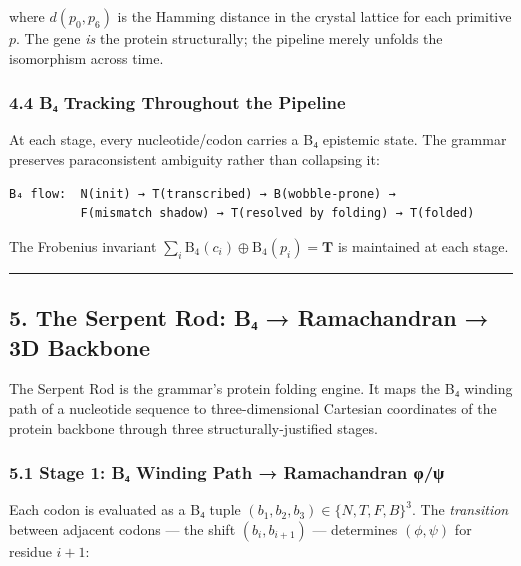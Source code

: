 \documentclass[12pt,a4paper]{article}
\begin{document}
where \(d(p_0, p_6)\) is the Hamming distance in the crystal lattice for
each primitive \(p\). The gene \emph{is} the protein structurally; the
pipeline merely unfolds the isomorphism across time.

\hypertarget{bux2084-tracking-throughout-the-pipeline}{%
\subsubsection{4.4 B₄ Tracking Throughout the
Pipeline}\label{bux2084-tracking-throughout-the-pipeline}}

At each stage, every nucleotide/codon carries a B₄ epistemic state. The
grammar preserves paraconsistent ambiguity rather than collapsing it:

\begin{verbatim}
B₄ flow:  N(init) → T(transcribed) → B(wobble-prone) → 
          F(mismatch shadow) → T(resolved by folding) → T(folded)
\end{verbatim}

The Frobenius invariant
\(\sum_i \text{B}_4(c_i) \oplus \text{B}_4(p_i) = \mathbf{T}\) is
maintained at each stage.

\begin{center}\rule{0.5\linewidth}{0.5pt}\end{center}

\hypertarget{the-serpent-rod-bux2084-ramachandran-3d-backbone}{%
\subsection{5. The Serpent Rod: B₄ → Ramachandran → 3D
Backbone}\label{the-serpent-rod-bux2084-ramachandran-3d-backbone}}

The Serpent Rod is the grammar's protein folding engine. It maps the B₄
winding path of a nucleotide sequence to three-dimensional Cartesian
coordinates of the protein backbone through three structurally-justified
stages.

\hypertarget{stage-1-bux2084-winding-path-ramachandran-ux3c6ux3c8}{%
\subsubsection{5.1 Stage 1: B₄ Winding Path → Ramachandran
φ/ψ}\label{stage-1-bux2084-winding-path-ramachandran-ux3c6ux3c8}}

Each codon is evaluated as a B₄ tuple
\((b_1, b_2, b_3) \in \{N, T, F, B\}^3\). The \emph{transition} between
adjacent codons --- the shift \((b_i, b_{i+1})\) --- determines
\((\phi, \psi)\) for residue \(i+1\):
\end{document}
